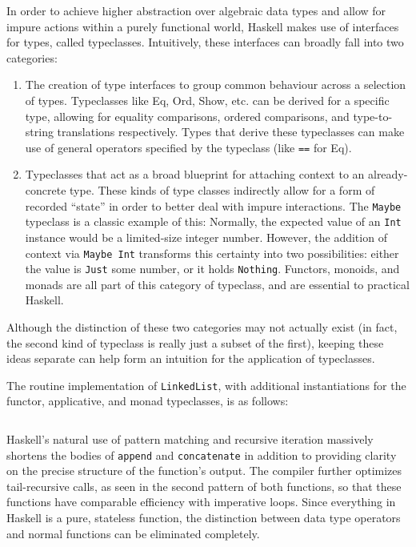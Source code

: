 \documentclass{article}
\begin{document}
In order to achieve higher abstraction over algebraic data types and allow for impure actions within a purely
functional world, Haskell makes use of interfaces for types, called typeclasses. Intuitively,
these interfaces can broadly fall into two categories:
\begin{enumerate}
    \item The creation of type interfaces to group common behaviour across a selection of types. Typeclasses like
    Eq, Ord, Show, etc. can be derived for a specific type, allowing for equality comparisons, ordered comparisons,
    and type-to-string translations respectively. Types that derive these typeclasses can make use of general operators
    specified by the typeclass (like \texttt{==} for Eq).
    \item Typeclasses that act as a broad blueprint for attaching context to an already-concrete type. These
    kinds of type classes indirectly allow for a form of recorded ``state'' in order to better deal with impure interactions.
    The \texttt{Maybe} typeclass is a classic example of this: Normally, the expected value of an \texttt{Int} instance
    would be a limited-size integer number. However, the addition of context via \texttt{Maybe Int} transforms this
    certainty into two possibilities: either the value is \texttt{Just} some number, or it holds \texttt{Nothing}.
    Functors, monoids, and monads are all part of this category of typeclass, and are essential to practical Haskell.
\end{enumerate}
Although the distinction of these two categories may not actually exist (in fact, the second kind of typeclass is really
just a subset of the first), keeping these ideas separate can help form an intuition for the application of typeclasses.

The routine implementation of \texttt{LinkedList}, with additional instantiations for the functor, applicative,
and monad typeclasses, is as follows:
\inputminted{haskell}{linked_list/main.hs}
Haskell's natural use of pattern matching and recursive iteration massively shortens the bodies of
\texttt{append} and \texttt{concatenate} in addition to providing clarity on the precise structure of the function's
output. The compiler further optimizes tail-recursive calls, as seen in the second pattern of both functions,
so that these functions have comparable efficiency with imperative loops.
Since everything in Haskell is a pure, stateless function, the distinction between data type
operators and normal functions can be eliminated completely.
\end{document}
